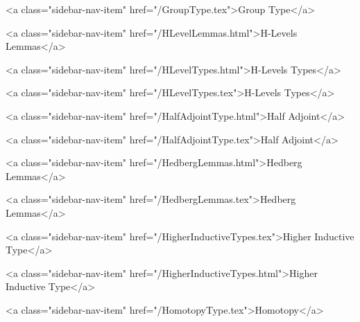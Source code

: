       
    
      
        
          <a class="sidebar-nav-item" href="/GroupType.tex">Group Type</a>
        
      
    
      
        
          <a class="sidebar-nav-item" href="/HLevelLemmas.html">H-Levels Lemmas</a>
        
      
    
      
        
          <a class="sidebar-nav-item" href="/HLevelTypes.html">H-Levels Types</a>
        
      
    
      
        
          <a class="sidebar-nav-item" href="/HLevelTypes.tex">H-Levels Types</a>
        
      
    
      
        
          <a class="sidebar-nav-item" href="/HalfAdjointType.html">Half Adjoint</a>
        
      
    
      
        
          <a class="sidebar-nav-item" href="/HalfAdjointType.tex">Half Adjoint</a>
        
      
    
      
        
          <a class="sidebar-nav-item" href="/HedbergLemmas.html">Hedberg Lemmas</a>
        
      
    
      
        
          <a class="sidebar-nav-item" href="/HedbergLemmas.tex">Hedberg Lemmas</a>
        
      
    
      
        
          <a class="sidebar-nav-item" href="/HigherInductiveTypes.tex">Higher Inductive Type</a>
        
      
    
      
        
          <a class="sidebar-nav-item" href="/HigherInductiveTypes.html">Higher Inductive Type</a>
        
      
    
      
        
          <a class="sidebar-nav-item" href="/HomotopyType.tex">Homotopy</a>
        
